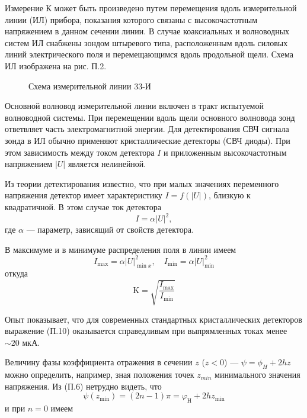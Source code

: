 \documentclass[a4paper,12pt]{article}
\begin{document}
Измерение К может быть произведено путем перемещения вдоль измерительной линии (ИЛ) прибора, показания которого связаны с высокочастотным напряжением в данном сечении линии. 
В случае коаксиальных и волноводных систем ИЛ снабжены зондом штыревого типа, расположенным вдоль силовых линий электрического поля и перемещающимся вдоль продольной щели. 
Схема ИЛ изображена на рис. П.2.
\begin{figure}[h!]
	\centering
	\caption{Схема измерительной линии 33-И}
	\label{fig:figure1}
\end{figure}

Основной волновод измерительной линии включен в тракт испытуемой волноводной системы. 
При перемещении вдоль щели основного волновода зонд ответвляет часть электромагнитной энергии. 
Для детектирования СВЧ сигнала зонда в ИЛ обычно применяют кристаллические детекторы (СВЧ диоды). 
При этом зависимость между током детектора $I$ и приложенным высокочастотным напряжением $|U|$ является нелинейной.

Из теории детектирования известно, что при малых значениях переменного напряжения детектор имеет характеристику $I=f(|U|)$, близкую к квадратичной. В этом случае ток детектора
\begin{equation}
	I=\alpha|U|^2,
\end{equation}
где $\alpha$ --- параметр, зависящий от свойств детектора.

В максимуме и в минимуме распределения поля в линии имеем
\begin{equation}
	I _ { \max } = \alpha | U | _ { \min x } ^ { 2 } , \quad I _ { \min } = \alpha | U | _ { \min } ^ { 2 }
\end{equation}
откуда
\begin{equation}
	\mathrm { K } = \sqrt { \frac { I _ { \mathrm { max } } } { I _ { \mathrm { min } } } }
\end{equation}

Опыт показывает, что для современных стандартных кристаллических детекторов выражение (П.10) оказывается справедливым при выпрямленных токах менее $\sim20$ мкА.

Величину фазы коэффициента отражения в сечении $z$ ($z<0$) --- $\psi=\phi_H+2hz$ можно определить, например, зная положения точек $z_{min}$ минимального значения напряжения. Из (П.6) нетрудно видеть, что
\begin{equation}
	\psi \left( z _ { \min } \right) = ( 2 n - 1 ) \pi = \varphi _ { \mathrm { H } } + 2 h z _ { \min }
\end{equation}
и при $n = 0$ имеем
\end{document}
